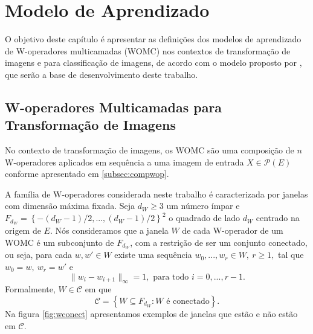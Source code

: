 
\chapter{Modelo de Aprendizado}
\label{chap:modelo}

O objetivo deste capítulo é apresentar as definições dos modelos de aprendizado de W-operadores multicamadas (WOMC) nos contextos de transformação de imagens e para classificação de imagens, de acordo com o modelo proposto por \cite{DIEGO:01}, que serão a base de desenvolvimento deste trabalho.


\section{W-operadores Multicamadas para Transformação de Imagens}
\label{sec:Wop_transformacao}

No contexto de transformação de imagens, os WOMC são uma composição de $n$ W-operadores aplicados em sequência a uma imagem de entrada $X \in \mathcal{P}\left( E \right)$ conforme apresentado em \ref{subsec:compwop}.

A família de W-operadores considerada neste trabalho é caracterizada por janelas com dimensão máxima fixada. Seja $d_{W} \geq 3$ um número ímpar e $F_{d_{W}} = \left\{ - \left( d_{W} -1 \right) /2 ,..., \left(	d_{W} - 1 \right) /2 \right\}^{2} $ o quadrado de lado $d_{W}$ centrado na origem de $E$. Nós consideramos que a janela $W$ de cada W-operador de um WOMC é um subconjunto de $F_{d_{W}}$, com a restrição de ser um conjunto conectado, ou seja, para cada $w, w' \in W$ existe uma sequência $w_{0},...,w_{r} \in W, \ r \geq 1, $ tal que $w_{0} = w, \ w_{r} = w' $ e 
$$ \| w_{i} - w_{i+1} \|_{\infty} = 1, \text{ para todo } i=0,...,r-1. $$
Formalmente, $W \in \mathscr{C}$ em que
$$ \mathscr{C} = \left\{ W \subseteq F_{d_{W}}  : W \text{ é conectado} \right\}. $$
Na figura \ref{fig:wconect} apresentamos exemplos de janelas que estão e não estão em $\mathscr{C}$.

